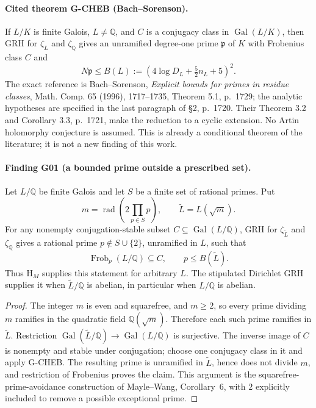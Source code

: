 \documentclass[11pt,a4paper]{article}
\begin{document}
\paragraph{Cited theorem G-CHEB (Bach--Sorenson).}
If $L/K$ is finite Galois, $L\ne\mathbb Q$, and $C$ is a conjugacy class in $\operatorname{Gal}(L/K)$, then GRH for $\zeta_L$ and $\zeta_{\mathbb Q}$ gives an unramified degree-one prime $\mathfrak p$ of $K$ with Frobenius class $C$ and
\[
 N\mathfrak p\le B(L):=(4\log D_L+\tfrac52 n_L+5)^2.
\]
The exact reference is Bach--Sorenson, \emph{Explicit bounds for primes in residue classes}, Math. Comp. 65 (1996), 1717--1735, Theorem 5.1, p.~1729; the analytic hypotheses are specified in the last paragraph of \S2, p.~1720.  Their Theorem 3.2 and Corollary 3.3, p.~1721, make the reduction to a cyclic extension.  No Artin holomorphy conjecture is assumed.  This is already a conditional theorem of the literature; it is not a new finding of this work.

\paragraph{Finding G01 (a bounded prime outside a prescribed set).}
Let $L/\mathbb Q$ be finite Galois and let $S$ be a finite set of rational primes. Put
\[
 m=\operatorname{rad}\!\left(2\prod_{p\in S}p\right),\qquad
 \widetilde L=L(\sqrt m).
\]
For any nonempty conjugation-stable subset $C\subseteq\operatorname{Gal}(L/\mathbb Q)$, GRH for $\zeta_{\widetilde L}$ and $\zeta_{\mathbb Q}$ gives a rational prime $p\notin S\cup\{2\}$, unramified in $L$, such that
\[
 \operatorname{Frob}_p(L/\mathbb Q)\subseteq C,
 \qquad p\le B(\widetilde L).
\]
Thus $\mathrm{H}_M$ supplies this statement for arbitrary $L$. The stipulated Dirichlet GRH supplies it when $\widetilde L/\mathbb Q$ is abelian, in particular when $L/\mathbb Q$ is abelian.

\begin{proof}
The integer $m$ is even and squarefree, and $m\ge2$, so every prime dividing $m$ ramifies in the quadratic field $\mathbb Q(\sqrt m)$.  Therefore each such prime ramifies in $\widetilde L$.  Restriction $\operatorname{Gal}(\widetilde L/\mathbb Q)\to\operatorname{Gal}(L/\mathbb Q)$ is surjective.  The inverse image of $C$ is nonempty and stable under conjugation; choose one conjugacy class in it and apply G-CHEB.  The resulting prime is unramified in $\widetilde L$, hence does not divide $m$, and restriction of Frobenius proves the claim.  This argument is the squarefree-prime-avoidance construction of Mayle--Wang, Corollary~6, with $2$ explicitly included to remove a possible exceptional prime.
\end{proof}
\end{document}

